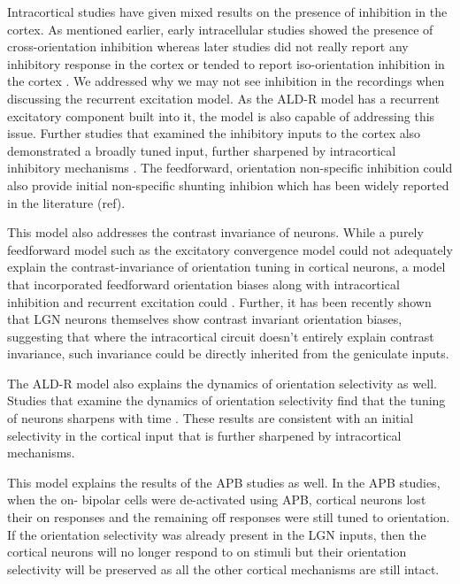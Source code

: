 Intracortical studies have given mixed results on the presence of inhibition in the cortex. As mentioned earlier, early intracellular studies showed the presence of cross-orientation inhibition \cite{Creutzfeldt1974, Pei1994} whereas later studies did not really report any inhibitory response in the cortex \cite{Ferster1986} or tended to report iso-orientation inhibition in the cortex \cite{Anderson2000}. We addressed why we may not see inhibition in the recordings when discussing the recurrent excitation model. As the ALD-R model has a recurrent excitatory component built into it, the model is also capable of addressing this issue. Further studies that examined the inhibitory inputs to the cortex also demonstrated a broadly tuned input, further sharpened by intracortical inhibitory mechanisms \cite{Pei1994, Volgushev1995, Volgushev2000}. The feedforward, orientation non-specific inhibition could also provide initial non-specific shunting inhibion which has been widely reported in the literature (ref).

This model also addresses the contrast invariance of neurons. While a purely feedforward model such as the excitatory convergence model could not adequately explain the contrast-invariance of orientation tuning in cortical neurons, a model that incorporated feedforward orientation biases along with intracortical inhibition and recurrent excitation could \cite{Vidyasagar1996b,Priebe2012}. Further, it has been recently shown that LGN neurons themselves show contrast invariant orientation biases, suggesting that where the intracortical circuit doesn't entirely explain contrast invariance, such invariance could be directly inherited from the geniculate inputs.

The ALD-R model also explains the dynamics of orientation selectivity as well. Studies that examine the dynamics of orientation selectivity find that the tuning of neurons sharpens with time \cite{Ringach2002c, Pei1994, Volgushev1995, Volgushev2000}. These results are consistent with an initial selectivity in the cortical input that is further sharpened by intracortical mechanisms. 

This model explains the results of the APB studies as well. In the APB studies, when the on- bipolar cells were de-activated using APB, cortical neurons lost their on responses and the remaining off responses were still tuned to orientation. If the orientation selectivity was already present in the LGN inputs, then the cortical neurons will no longer respond to on stimuli but their orientation selectivity will be preserved as all the other cortical mechanisms are still intact.

